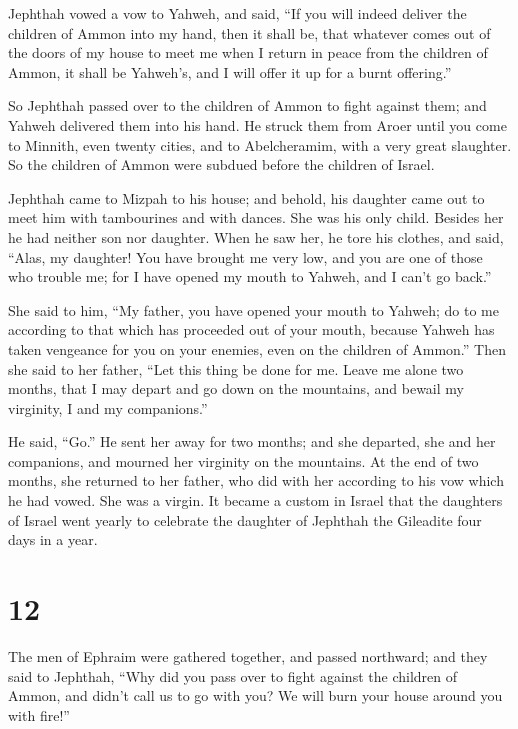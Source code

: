  Jephthah vowed a vow to Yahweh, and said, ``If you will
indeed deliver the children of Ammon into my hand,  then it
shall be, that whatever comes out of the doors of my house to meet me
when I return in peace from the children of Ammon, it shall be Yahweh's,
and I will offer it up for a burnt offering.''

 So Jephthah passed over to the children of Ammon to fight
against them; and Yahweh delivered them into his hand.  He
struck them from Aroer until you come to Minnith, even twenty cities,
and to Abelcheramim, with a very great slaughter. So the children of
Ammon were subdued before the children of Israel.

 Jephthah came to Mizpah to his house; and behold, his
daughter came out to meet him with tambourines and with dances. She was
his only child. Besides her he had neither son nor daughter.
 When he saw her, he tore his clothes, and said, ``Alas, my
daughter! You have brought me very low, and you are one of those who
trouble me; for I have opened my mouth to Yahweh, and I can't go back.''

 She said to him, ``My father, you have opened your mouth
to Yahweh; do to me according to that which has proceeded out of your
mouth, because Yahweh has taken vengeance for you on your enemies, even
on the children of Ammon.''  Then she said to her father,
``Let this thing be done for me. Leave me alone two months, that I may
depart and go down on the mountains, and bewail my virginity, I and my
companions.''

 He said, ``Go.'' He sent her away for two months; and she
departed, she and her companions, and mourned her virginity on the
mountains.  At the end of two months, she returned to her
father, who did with her according to his vow which he had vowed. She
was a virgin. It became a custom in Israel  that the
daughters of Israel went yearly to celebrate the daughter of Jephthah
the Gileadite four days in a year.

\hypertarget{section-11}{%
\section{12}\label{section-11}}

 The men of Ephraim were gathered together, and passed
northward; and they said to Jephthah, ``Why did you pass over to fight
against the children of Ammon, and didn't call us to go with you? We
will burn your house around you with fire!''

